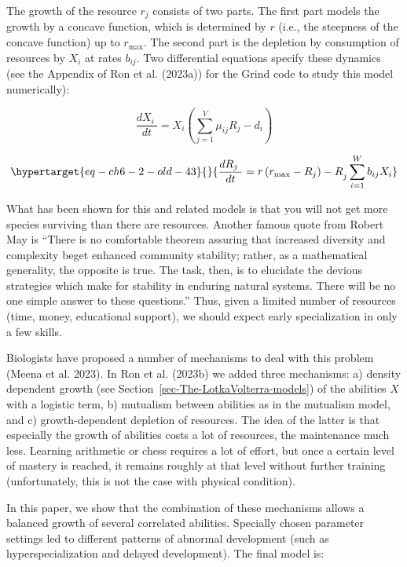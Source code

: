 \documentclass[
  a4paper,
  DIV=11,
  numbers=noendperiod,
  oneside]{scrreprt}
\begin{document}
The growth of the resource \(r_{j}\) consists of two parts. The first
part models the growth by a concave function, which is determined by
\(r\) (i.e., the steepness of the concave function) up to \(r_{\max}\).
The second part is the depletion by consumption of resources by
\(X_{i}\) at rates \(b_{ij}\). Two differential equations specify these
dynamics (see the Appendix of Ron et al. (2023a)) for the Grind code to
study this model numerically):

\[\frac{dX_{i}\ }{dt} = X_{i}(\sum_{j = 1}^{V}{\mu_{ij}R_{j} - d_{i}})\]

\begin{equation}\protect\hypertarget{eq-ch6-2-old-43}{}{
\frac{dR_{j}\ }{dt} = {r\left( r_{\max} - R_{j} \right) - R}_{j}\sum_{i = 1}^{W}{b_{ij}X_{i}}
}\label{eq-ch6-2-old-43}\end{equation}

What has been shown for this and related models is that you will not get
more species surviving than there are resources. Another famous quote
from Robert May is ``There is no comfortable theorem assuring that
increased diversity and complexity beget enhanced community stability;
rather, as a mathematical generality, the opposite is true. The task,
then, is to elucidate the devious strategies which make for stability in
enduring natural systems. There will be no one simple answer to these
questions.'' Thus, given a limited number of resources (time, money,
educational support), we should expect early specialization in only a
few skills.

Biologists have proposed a number of mechanisms to deal with this
problem (Meena et al. 2023). In Ron et al. (2023b) we added three
mechanisms: a) density dependent growth (see
Section~\ref{sec-The-LotkaVolterra-models}) of the abilities \(X\) with
a logistic term, b) mutualism between abilities as in the mutualism
model, and c) growth-dependent depletion of resources. The idea of the
latter is that especially the growth of abilities costs a lot of
resources, the maintenance much less. Learning arithmetic or chess
requires a lot of effort, but once a certain level of mastery is
reached, it remains roughly at that level without further training
(unfortunately, this is not the case with physical condition).

In this paper, we show that the combination of these mechanisms allows a
balanced growth of several correlated abilities. Specially chosen
parameter settings led to different patterns of abnormal development
(such as hyperspecialization and delayed development). The final model
is:
\end{document}
